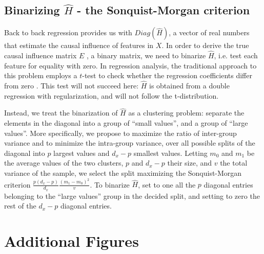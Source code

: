\subsection{Binarizing $\hat{H}$ - the Sonquist-Morgan criterion}

Back to back regression provides us with $Diag(\hat{H})$, a vector of real numbers that estimate the causal influence of features in $X$. In order to derive the true causal influence matrix $E$ , a binary matrix, we need to binarize  $\hat{H}$, i.e. test each feature for equality with zero. In regression analysis, the traditional approach to this problem employs a $t$-test to check whether the regression coefficients differ from zero \citep{student1908probable}. This test will not succeed here: $\hat{H}$ is obtained from a double regression with regularization, and will not follow the t-distribution.

Instead, we treat the binarization of $\hat{H}$ as a clustering problem: separate the elements in the diagonal into a group of ``small values'', and a group of ``large values''. More specifically, we propose to maximize the ratio of inter-group variance and to minimize the intra-group variance, over all possible splits of the diagonal into $p$ largest values and $d_x-p$ smallest values.
%
Letting $m_0$ and $m_1$ be the average values of the two clusters, $p$ and $d_x-p$ their size, and $v$ the total variance of the sample, we select the split maximizing the Sonquist-Morgan \citep{sonquist_morgan} \citep{kass75} criterion $\frac{p(d_x-p)}{d_x} \frac{(m_1 - m_0)^2}{v}$.
%
To binarize $\hat{H}$, set to one all the $p$ diagonal entries belonging to the ``large values'' group in the decided split, and setting to zero the rest of the $d_x-p$ diagonal entries.


\section{Additional Figures}




